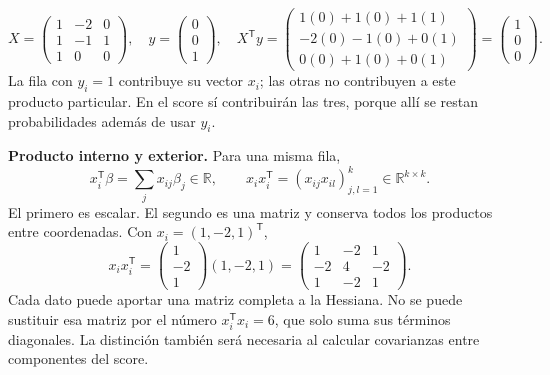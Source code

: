 \documentclass[11pt,a4paper]{article}
\newcommand{\R}{\mathbb R}
\newcommand{\T}{^{\mathsf T}}
\begin{document}
\begin{ejemplo}
\[
X=\begin{pmatrix}1&-2&0\\1&-1&1\\1&0&0\end{pmatrix},
\quad y=\begin{pmatrix}0\\0\\1\end{pmatrix},
\quad
X\T y=
\begin{pmatrix}1(0)+1(0)+1(1)\\
-2(0)-1(0)+0(1)\\0(0)+1(0)+0(1)\end{pmatrix}
=\begin{pmatrix}1\\0\\0\end{pmatrix}.
\]
La fila con $y_i=1$ contribuye su vector $x_i$; las otras no contribuyen
a este producto particular. En el score sí contribuirán las tres, porque
allí se restan probabilidades además de usar $y_i$.
\end{ejemplo}
\textbf{Producto interno y exterior.}
Para una misma fila,
\[
x_i\T\beta=\sum_jx_{ij}\beta_j\in\R,\qquad
x_ix_i\T=(x_{ij}x_{il})_{j,l=1}^k\in\R^{k\times k}.
\]
El primero es escalar. El segundo es una matriz y conserva todos
los productos entre coordenadas.
Con $x_i=(1,-2,1)\T$,
\[
x_ix_i\T=
\begin{pmatrix}1\\-2\\1\end{pmatrix}(1,-2,1)
=\begin{pmatrix}1&-2&1\\-2&4&-2\\1&-2&1\end{pmatrix}.
\]
Cada dato puede aportar una matriz completa a la Hessiana.
No se puede sustituir esa matriz por el número $x_i\T x_i=6$,
que solo suma sus términos diagonales.
La distinción también será necesaria al calcular covarianzas entre
componentes del score.

\clearpage
\end{document}
